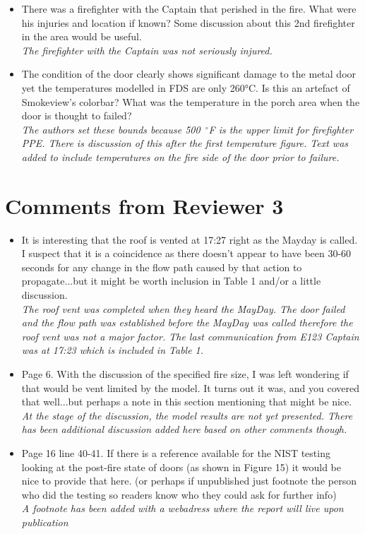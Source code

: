 \documentclass[12pt]{article}
\begin{document}
\begin{itemize}
\item There was a firefighter with the Captain that perished in the fire.  What were his injuries and location if known?  Some discussion about this 2nd firefighter in the area would be useful. \\
{\it The firefighter with the Captain was not seriously injured.}
\item The condition of the door clearly shows significant damage to the metal door yet the temperatures modelled in FDS are only 260°C.   Is this an artefact of Smokeview's colorbar?  What was the temperature in the porch area when the door is thought to failed?\\
{\it The authors set these bounds because 500~$^{\circ}$F is the upper limit for firefighter PPE. There is discussion of this after the first temperature figure. Text was added to include temperatures on the fire side of the door prior to failure.}
\end{itemize}


\section{Comments from Reviewer 3}
\begin{itemize}
\item It is interesting that the roof is vented at 17:27 right as the Mayday is called.  I suspect that it is a coincidence as there doesn't appear to have been 30-60 seconds for any change in the flow path caused by that action to propagate...but it might be worth inclusion in Table 1 and/or a little discussion. \\
{\it The roof vent was completed when they heard the MayDay. The door failed and the flow path was established before the MayDay was called therefore the roof vent was not a major factor. The last communication from E123 Captain was at 17:23 which is included in Table 1.}
\item Page 6.  With the discussion of the specified fire size, I was left wondering if that would be vent limited by the model.  It turns out it was, and you covered that well...but perhaps a note in this section mentioning that might be nice. \\
{\it At the stage of the discussion, the model results are not yet presented. There has been additional discussion added here based on other comments though.}
\item Page 16 line 40-41.  If there is a reference available for the NIST testing looking at the post-fire state of doors (as shown in Figure 15) it would be nice to provide that here. (or perhaps if unpublished just footnote the person who did the testing so readers know who they could ask for further info) \\
{\it A footnote has been added with a webadress where the report will live upon publication}
\end{itemize}
\end{document}
